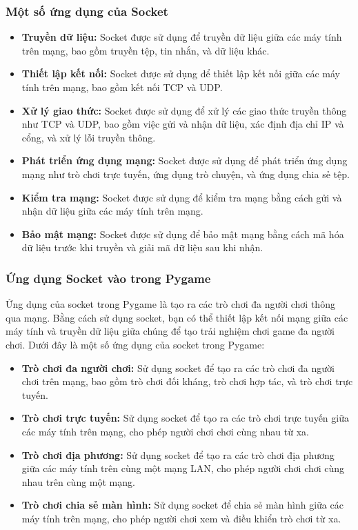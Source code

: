 \documentclass[a4paper]{article}
\begin{document}
\subsubsection[short]{Một số ứng dụng của Socket}
\begin{itemize}
	\item \textbf{Truyền dữ liệu:} Socket được sử dụng để truyền dữ liệu giữa các máy tính trên mạng, bao gồm truyền tệp, tin nhắn, và dữ liệu khác.
	\item \textbf{Thiết lập kết nối:} Socket được sử dụng để thiết lập kết nối giữa các máy tính trên mạng, bao gồm kết nối TCP và UDP.
	\item \textbf{Xử lý giao thức:} Socket được sử dụng để xử lý các giao thức truyền thông như TCP và UDP, bao gồm việc gửi và nhận dữ liệu, xác định địa chỉ IP và cổng, và xử lý lỗi truyền thông.
	\item \textbf{Phát triển ứng dụng mạng:} Socket được sử dụng để phát triển ứng dụng mạng như trò chơi trực tuyến, ứng dụng trò chuyện, và ứng dụng chia sẻ tệp.
	\item \textbf{Kiểm tra mạng:} Socket được sử dụng để kiểm tra mạng bằng cách gửi và nhận dữ liệu giữa các máy tính trên mạng.
	\item \textbf{Bảo mật mạng:} Socket được sử dụng để bảo mật mạng bằng cách mã hóa dữ liệu trước khi truyền và giải mã dữ liệu sau khi nhận.
\end{itemize}

\subsubsection[short]{Ứng dụng Socket vào trong Pygame}
\hspace{5mm}
Ứng dụng của socket trong Pygame là tạo ra các trò chơi đa người chơi thông qua mạng. Bằng cách sử dụng socket, bạn có thể thiết lập kết nối mạng giữa các máy tính và truyền dữ liệu giữa chúng để tạo trải nghiệm chơi game đa người chơi. Dưới đây là một số ứng dụng của socket trong Pygame:
\begin{itemize}
	\item \textbf{Trò chơi đa người chơi:} Sử dụng socket để tạo ra các trò chơi đa người chơi trên mạng, bao gồm trò chơi đối kháng, trò chơi hợp tác, và trò chơi trực tuyến.
	\item \textbf{Trò chơi trực tuyến:} Sử dụng socket để tạo ra các trò chơi trực tuyến giữa các máy tính trên mạng, cho phép người chơi chơi cùng nhau từ xa.
	\item \textbf{Trò chơi địa phương:} Sử dụng socket để tạo ra các trò chơi địa phương giữa các máy tính trên cùng một mạng LAN, cho phép người chơi chơi cùng nhau trên cùng một mạng.
	\item \textbf{Trò chơi chia sẻ màn hình:} Sử dụng socket để chia sẻ màn hình giữa các máy tính trên mạng, cho phép người chơi xem và điều khiển trò chơi từ xa.

\end{itemize}
\end{document}

